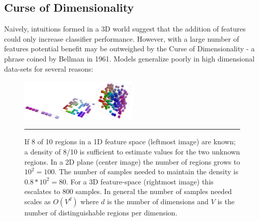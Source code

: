 \subsection{Curse of Dimensionality}
Naively, intuitions formed in a 3D world suggest that the addition of features could only increase classifier performance.
However, with a large number of features potential benefit may be outweighed by the Curse of Dimensionality - a phrase coined by Bellman in 1961\citep{domingos2012few}.
Models generalize poorly in high dimensional data-sets for several reasons:

\begin{figure}[htbp]
	\centering
		\includegraphics[width = 0.5\textwidth]{./Figures/Curse_of_dimentionality_DL_textbook_7.jpg}
		\rule{35em}{0.5pt}
	\caption[Curse of Dimensionality]{If 8 of 10 regions in a 1D feature space (leftmost image) are known; a density of 8/10 is sufficient to estimate values for the two unknown regions. In a 2D plane (center image) the number of regions grows to $10^2=100$. The number of samples needed to maintain the density is $0.8*10^2=80$. For a 3D feature-space (rightmost image) this escalates to 800 samples. In general the number of samples needed scales as $O(V^d)$ where $d$ is the number of dimensions and $V$ is the number of distinguishable regions per dimension.}
	\label{fig:Curse_of_dimensionality}
\end{figure}

